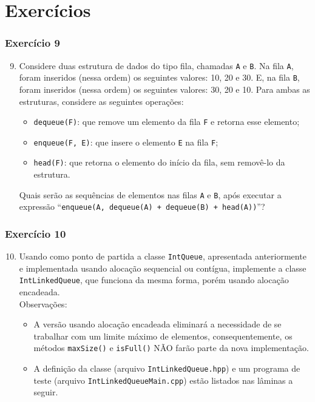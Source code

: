 \documentclass[aspectratio=169]{beamer}
\begin{document}
\section{Exercícios}

\begin{frame}[fragile]\frametitle{Exercício 9}
\begin{enumerate}
        \setcounter{enumi}{8}
	\item Considere duas estrutura de dados do tipo fila, chamadas \texttt{A} e \texttt{B}. Na fila \texttt{A}, foram inseridos (nessa ordem) os seguintes valores: 10, 20 e 30. E, na fila \texttt{B}, foram inseridos (nessa ordem) os seguintes valores: 30, 20 e 10. Para ambas as estruturas, considere as seguintes operações:
\begin{itemize}
	\item \texttt{dequeue(F)}: que remove um elemento da fila \texttt{F} e retorna esse elemento;
	\item \texttt{enqueue(F, E)}: que insere o elemento \texttt{E} na fila \texttt{F};
	\item \texttt{head(F)}: que retorna o elemento do início da fila, sem removê-lo da estrutura.
\end{itemize}
Quais serão as sequências de elementos nas filas \texttt{A} e \texttt{B}, após executar a expressão ``\texttt{enqueue(A, dequeue(A) + dequeue(B) + head(A))}''?
\end{enumerate}
\end{frame}

\begin{frame}[fragile]\frametitle{Exercício 10}
\begin{enumerate}
        \setcounter{enumi}{9}
	\item Usando como ponto de partida a classe \texttt{IntQueue}, apresentada anteriormente e implementada usando alocação sequencial ou contígua, implemente a classe \texttt{IntLinkedQueue}, que funciona da mesma forma, porém usando alocação encadeada.\\
	Observações:
	\begin{itemize}
		\item A versão usando alocação encadeada eliminará a necessidade de se trabalhar com um limite máximo de elementos, consequentemente, os métodos \texttt{maxSize()} e \texttt{isFull()} NÃO farão parte da nova implementação.
		\item A definição da classe (arquivo \texttt{IntLinkedQueue.hpp}) e um programa de teste (arquivo \texttt{IntLinkedQueueMain.cpp}) estão listados nas lâminas a seguir.
	\end{itemize}
\end{enumerate}
\end{frame}
\end{document}
